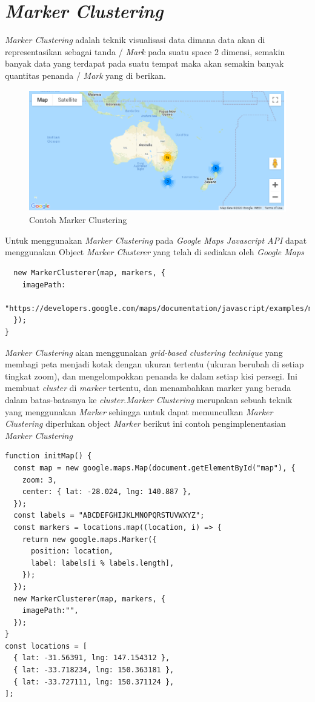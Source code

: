  
\section{\textit{Marker Clustering}}
 \textit{Marker Clustering } adalah teknik visualisasi data dimana data akan di representasikan sebagai tanda / \textit{Mark} pada suatu space 2 dimensi, semakin banyak data yang terdapat pada suatu tempat maka akan semakin banyak quantitas penanda / \textit{Mark} yang di berikan. \cite{GoogleMarkerCluster:01:Maps}
  \begin{figure}[H]
    \centering
    \includegraphics[scale=0.5]{Gambar/marker_clustering.PNG}
    \caption{Contoh Marker Clustering}
    \label{fig:my_label}
\end{figure}
Untuk menggunakan \textit{Marker Clustering} pada \textit{Google Maps Javascript API} dapat menggunakan Object \textit{Marker Clusterer} yang telah di sediakan oleh \textit{Google Maps} 
  \begin{lstlisting}
  new MarkerClusterer(map, markers, {
    imagePath:
      "https://developers.google.com/maps/documentation/javascript/examples/markerclusterer/m",
  });
}
 \end{lstlisting}
 \textit{Marker Clustering} akan menggunakan   \textit{grid-based clustering technique} yang membagi peta menjadi kotak dengan ukuran tertentu (ukuran berubah di setiap tingkat zoom), dan mengelompokkan penanda ke dalam setiap kisi persegi. Ini membuat \textit{cluster} di \textit{marker} tertentu, dan menambahkan marker yang berada dalam batas-batasnya ke \textit{cluster}.\textit{Marker Clustering} merupakan sebuah teknik yang menggunakan \textit{Marker} sehingga untuk dapat memunculkan \textit{Marker Clustering} diperlukan object \textit{Marker}
 berikut ini contoh pengimplenentasian \textit{Marker Clustering}\cite{GoogleMarkerCluster:01:Maps}
 
 \begin{lstlisting}
function initMap() {
  const map = new google.maps.Map(document.getElementById("map"), {
    zoom: 3,
    center: { lat: -28.024, lng: 140.887 },
  });
  const labels = "ABCDEFGHIJKLMNOPQRSTUVWXYZ";
  const markers = locations.map((location, i) => {
    return new google.maps.Marker({
      position: location,
      label: labels[i % labels.length],
    });
  });
  new MarkerClusterer(map, markers, {
    imagePath:"",
  });
}
const locations = [
  { lat: -31.56391, lng: 147.154312 },
  { lat: -33.718234, lng: 150.363181 },
  { lat: -33.727111, lng: 150.371124 },
];
\end{lstlisting}